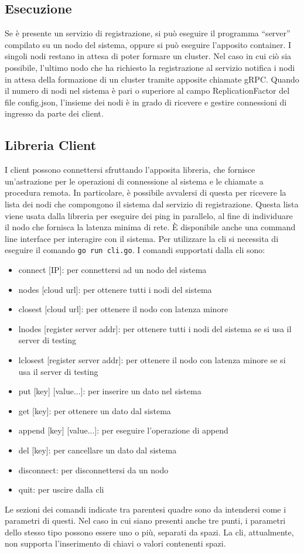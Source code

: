 \documentclass[conference]{IEEEtran}
\begin{document}
\subsection{Esecuzione}
Se è presente un servizio di registrazione, si può eseguire il programma ``server'' compilato su un nodo del sistema, oppure
si può eseguire l'apposito container. I singoli nodi restano in attesa di poter formare un cluster. Nel caso in cui ciò
sia possibile, l'ultimo nodo che ha richiesto la registrazione al servizio notifica i nodi in attesa della formazione di
un cluster tramite apposite chiamate gRPC. Quando il numero di nodi nel sistema è pari o superiore al campo ReplicationFactor
del file config.json, l'insieme dei nodi è in grado di ricevere e gestire connessioni di ingresso da parte dei client.
\subsection{Libreria Client}
I client possono connettersi sfruttando l'apposita libreria, che fornisce un'astrazione per le operazioni di connessione
al sistema e le chiamate a procedura remota. In particolare, è possibile avvalersi di questa per ricevere la lista dei
nodi che compongono il sistema dal servizio di registrazione. Questa lista viene usata dalla libreria per eseguire dei
ping in parallelo, al fine di individuare il nodo che fornisca la latenza minima di rete.
È disponibile anche una command line interface per interagire con il sistema. Per utilizzare la cli si necessita di eseguire
il comando \verb!go run cli.go!. I comandi supportati dalla cli sono:
\begin{itemize}
  \item connect [IP]: per connettersi ad un nodo del sistema
  \item nodes [cloud url]: per ottenere tutti i nodi del sistema
  \item closest [cloud url]: per ottenere il nodo con latenza minore
  \item lnodes [register server addr]: per ottenere tutti i nodi del sistema se si usa il server di testing
  \item lclosest [register server addr]: per ottenere il nodo con latenza minore se si usa il server di testing
  \item put [key] [value...]: per inserire un dato nel sistema
  \item get [key]: per ottenere un dato dal sistema
  \item append [key] [value...]: per eseguire l'operazione di append
  \item del [key]: per cancellare un dato dal sistema
  \item disconnect: per disconnettersi da un nodo
  \item quit: per uscire dalla cli
\end{itemize}
Le sezioni dei comandi indicate tra parentesi quadre sono da intendersi come i parametri di questi. Nel caso in cui
siano presenti anche tre punti, i parametri dello stesso tipo possono essere uno o più, separati da spazi. La cli, attualmente, non supporta
l'inserimento di chiavi o valori contenenti spazi.

\printbibliography
\end{document}
